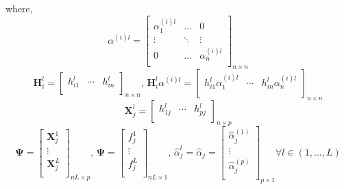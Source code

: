\documentclass[a4paper]{article}
\begin{document}
where,
$$
\alpha^{\left( i \right)l} = 
\begin{bmatrix}
\alpha_{1}^{\left( i \right)l} & \ldots & 0\\
\vdots & \ddots & \vdots \\
0 & \ldots & \alpha_{n}^{\left( i \right)l} \\
\end{bmatrix}_{n \times n}
$$
$$
\textbf{H}_{i}^{l} = 
\begin{bmatrix}
h_{i1}^{l} & \cdots & h_{in}^{l} \\
\end{bmatrix}_{n \times n}
\text{, }
\textbf{H}_{i}^{l} \alpha^{\left( i \right)l} = 
\begin{bmatrix}
h_{i1}^{l} \alpha_{1}^{\left( i \right)l} & \cdots & h_{in}^{l} \alpha_{n}^{\left( i \right)l} \\
\end{bmatrix}_{n \times n}
$$
$$
\textbf{X}_{j}^{l} = 
\begin{bmatrix}
h_{1j}^{l} & \cdots & h_{pj}^{l} \\
\end{bmatrix}_{n \times p}
$$
$$
\mathbf{\Psi} = 
\begin{bmatrix}
\textbf{X}_{j}^{1} \\
\vdots \\
\textbf{X}_{j}^{L} \\
\end{bmatrix}_{nL \times p} 
\text{, }
\mathbf{\Psi} = 
\begin{bmatrix}
f_{j}^{1} \\
\vdots \\
f_{j}^{L} \\
\end{bmatrix}_{nL \times 1}
\text{, }
\hat{\alpha}_{j}^{l} = 
\hat{\alpha}_{j} =
\begin{bmatrix}
\hat{\alpha}_{j}^{ \left( 1 \right) } \\
\vdots \\
\hat{\alpha}_{j}^{ \left( p \right)} \\
\end{bmatrix}_{p \times 1}
\forall l \in \left( 1,...,L \right)
$$
\end{document}
